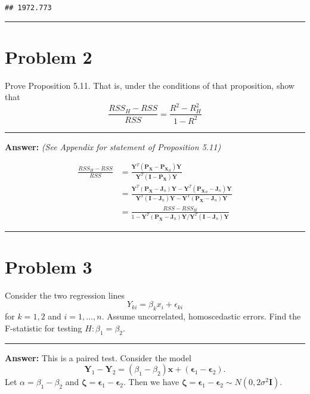\documentclass[
]{article}
\newcommand{\bmI}{\ensuremath{\bm I}}
\newcommand{\bmJ}{\ensuremath{\bm J}}
\newcommand{\bmP}{\ensuremath{\bm P}}
\newcommand{\bmX}{\ensuremath{\bm X}}
\newcommand{\bmx}{\ensuremath{\bm x}}
\newcommand{\bmY}{\ensuremath{\bm Y}}
\newcommand{\bmepsilon}{\ensuremath{\bm{\epsilon}}}
\newcommand{\bmzeta}{\ensuremath{\bm{\zeta}}}
\begin{document}
\begin{verbatim}
## 1972.773
\end{verbatim}

\begin{center}\rule{0.5\linewidth}{0.5pt}\end{center}

\hypertarget{problem-2}{%
\section{Problem 2}\label{problem-2}}

Prove Proposition 5.11. That is, under the conditions of that
proposition, show that
\[\frac{RSS_H - RSS}{RSS} = \frac{R^2 - R^2_H}{1 - R^2}\]

\begin{center}\rule{0.5\linewidth}{0.5pt}\end{center}

\textbf{Answer:} \emph{(See Appendix for statement of Proposition 5.11)}

\begin{align*}
\frac{RSS_H - RSS}{RSS} &= \frac{\bmY^T(\bmP_{\bmX} - \bmP_{\bmX_H})\bmY}{\bmY^T(\bmI - \bmP_{\bmX})\bmY} \\
&= \frac{\bmY^T(\bmP_{\bmX} - \bmJ_n)\bmY - \bmY^T(\bmP_{\bmX_H} - \bmJ_n)\bmY}{\bmY^T(\bmI - \bmJ_n)\bmY - \bmY^T(\bmP_{\bmX} - \bmJ_n)\bmY} \\
&= \frac{RSS - RSS_H}{1 - \bmY^T(\bmP_{\bmX} - \bmJ_n)\bmY/\bmY^T(\bmI - \bmJ_n)\bmY}
\end{align*}

\begin{center}\rule{0.5\linewidth}{0.5pt}\end{center}

\hypertarget{problem-3}{%
\section{Problem 3}\label{problem-3}}

Consider the two regression lines
\[Y_{ki} = \beta_kx_i + \epsilon_{ki}\] for \(k=1, 2\) and
\(i=1, \dots, n\). Assume uncorrelated, homoscedastic errors. Find the
F-statistic for testing \(H : \beta_1 = \beta_2\).

\begin{center}\rule{0.5\linewidth}{0.5pt}\end{center}

\textbf{Answer:} This is a paired test. Consider the model \[
\bmY_{1} - \bmY_{2} = (\beta_1 - \beta_2)\bmx + (\bmepsilon_{1} - \bm\epsilon_{2}).
\] Let \(\alpha = \beta_1 - \beta_2\) and
\(\bmzeta = \bmepsilon_{1} - \bmepsilon_{2}.\) Then we have
\(\bmzeta = \bmepsilon_1 - \bmepsilon_2 \sim N(0, 2\sigma^2\bmI)\).
\end{document}
